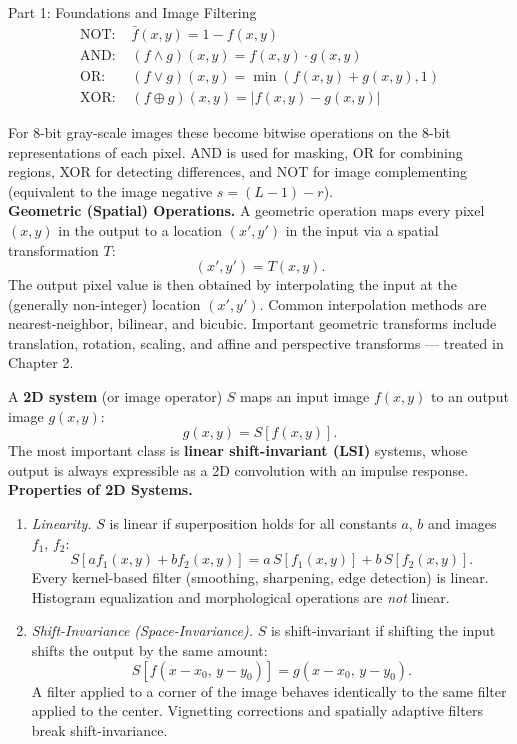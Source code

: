 \documentclass[letterpaper]{article}
\begin{document}
\begin{notes}{Part 1: Foundations and Image Filtering}
\begin{align*}
    \text{NOT: } & \bar{f}(x,y) = 1 - f(x,y)\\
    \text{AND: } & (f\wedge g)(x,y) = f(x,y)\cdot g(x,y)\\
    \text{OR: }  & (f\vee g)(x,y)   = \min(f(x,y)+g(x,y),1)\\
    \text{XOR: } & (f\oplus g)(x,y) = |f(x,y)-g(x,y)|
\end{align*}

For 8-bit gray-scale images these become bitwise operations on the 8-bit representations of each pixel. AND is used for masking, OR for combining regions, XOR for detecting differences, and NOT for image complementing (equivalent to the image negative $s=(L-1)-r$).\\

\textbf{Geometric (Spatial) Operations.} A geometric operation maps every pixel $(x,y)$ in the output to a location $(x',y')$ in the input via a spatial transformation $T$:
$$(x',y') = T(x,y).$$
The output pixel value is then obtained by interpolating the input at the (generally non-integer) location $(x',y')$. Common interpolation methods are nearest-neighbor, bilinear, and bicubic. Important geometric transforms include translation, rotation, scaling, and affine and perspective transforms — treated in Chapter 2.


\newpage





A \textbf{2D system} (or image operator) $S$ maps an input image $f(x,y)$ to an output image $g(x,y)$:
$$g(x,y) = S[f(x,y)].$$
The most important class is \textbf{linear shift-invariant (LSI)} systems, whose output is always expressible as a 2D convolution with an impulse response.\\

\textbf{Properties of 2D Systems.}
\begin{enumerate}
    \item \textit{Linearity.} $S$ is linear if superposition holds for all constants $a$, $b$ and images $f_1$, $f_2$:
    $$S[af_1(x,y) + bf_2(x,y)] = a\,S[f_1(x,y)] + b\,S[f_2(x,y)].$$
    Every kernel-based filter (smoothing, sharpening, edge detection) is linear. Histogram equalization and morphological operations are \emph{not} linear.

    \item \textit{Shift-Invariance (Space-Invariance).} $S$ is shift-invariant if shifting the input shifts the output by the same amount:
    $$S[f(x-x_0,\, y-y_0)] = g(x-x_0,\, y-y_0).$$
    A filter applied to a corner of the image behaves identically to the same filter applied to the center. Vignetting corrections and spatially adaptive filters break shift-invariance.


\end{enumerate}
\end{notes}
\end{document}
